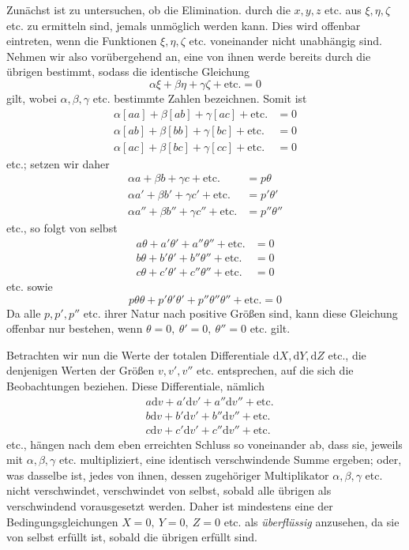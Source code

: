 Zunächst ist zu untersuchen, ob die Elimination. durch die \(x,y,z\) etc. aus \(\xi,\eta,\zeta\) etc. zu ermitteln sind, jemals unmöglich werden kann. Dies wird offenbar eintreten, wenn die Funktionen \(\xi,\eta,\zeta\) etc. voneinander nicht unabhängig sind. Nehmen wir also vorübergehend an, eine von ihnen werde bereits durch die übrigen bestimmt, sodass die identische Gleichung
\[
\alpha\xi+\beta\eta+\gamma\zeta+\text{etc.}=0
\]
gilt, wobei \(\alpha,\beta,\gamma\) etc. bestimmte Zahlen bezeichnen. Somit ist
\[
\begin{aligned}
\alpha[aa]+\beta[ab]+\gamma[ac]+\text{etc.}&=0\\
\alpha[ab]+\beta[bb]+\gamma[bc]+\text{etc.}&=0\\
\alpha[ac]+\beta[bc]+\gamma[cc]+\text{etc.}&=0
\end{aligned}
\]
etc.; setzen wir daher
\[
\begin{aligned}
\alpha a+\beta b+\gamma c+\text{etc.}&=p\theta\\
\alpha a'+\beta b'+\gamma c'+\text{etc.}&=p'\theta'\\
\alpha a''+\beta b''+\gamma c''+\text{etc.}&=p''\theta''
\end{aligned}
\]
etc., so folgt von selbst
\[
\begin{aligned}
a\theta+a'\theta'+a''\theta''+\text{etc.}&=0\\
b\theta+b'\theta'+b''\theta''+\text{etc.}&=0\\
c\theta+c'\theta'+c''\theta''+\text{etc.}&=0
\end{aligned}
\]
etc. sowie
\[
p\theta\theta+p'\theta'\theta'+p''\theta''\theta''+\text{etc.}=0
\]
Da alle \(p,p',p''\) etc. ihrer Natur nach positive Größen sind, kann diese Gleichung offenbar nur bestehen, wenn \(\theta=0,\ \theta'=0,\ \theta''=0\) etc. gilt.

Betrachten wir nun die Werte der totalen Differentiale \(\mathrm dX,\mathrm dY,\mathrm dZ\) etc., die denjenigen Werten der Größen \(v,v',v''\) etc. entsprechen, auf die sich die Beobachtungen beziehen. Diese Differentiale, nämlich
\[
\begin{aligned}
&a\mathrm dv+a'\mathrm dv'+a''\mathrm dv''+\text{etc.}\\
&b\mathrm dv+b'\mathrm dv'+b''\mathrm dv''+\text{etc.}\\
&c\mathrm dv+c'\mathrm dv'+c''\mathrm dv''+\text{etc.}
\end{aligned}
\]
etc., hängen nach dem eben erreichten Schluss so voneinander ab, dass sie, jeweils mit \(\alpha,\beta,\gamma\) etc. multipliziert, eine identisch verschwindende Summe ergeben; oder, was dasselbe ist, jedes von ihnen, dessen zugehöriger Multiplikator \(\alpha,\beta,\gamma\) etc. nicht verschwindet, verschwindet von selbst, sobald alle übrigen als verschwindend vorausgesetzt werden. Daher ist mindestens eine der Bedingungsgleichungen \(X=0,\ Y=0,\ Z=0\) etc. als \textit{überflüssig} anzusehen, da sie von selbst erfüllt ist, sobald die übrigen erfüllt sind.

